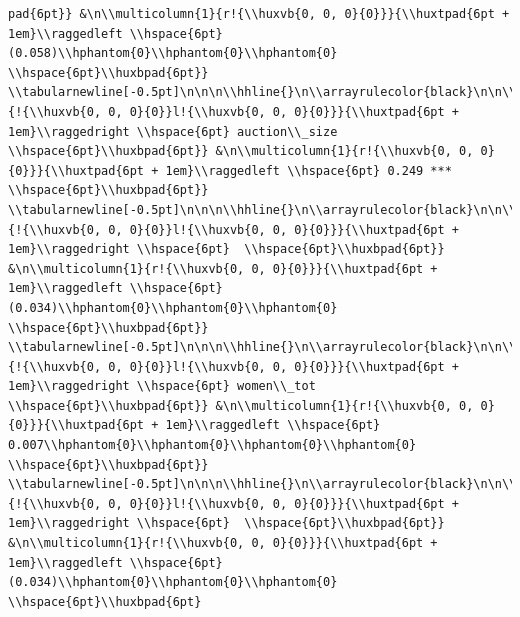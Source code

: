 \documentclass[11pt,preprint, authoryear]{elsarticle}
\numberwithin{equation}{section}
\numberwithin{figure}{section}
\numberwithin{table}{section}
\begin{document}
\begin{verbatim}
pad{6pt}} &\n\\multicolumn{1}{r!{\\huxvb{0, 0, 0}{0}}}{\\huxtpad{6pt + 1em}\\raggedleft \\hspace{6pt} (0.058)\\hphantom{0}\\hphantom{0}\\hphantom{0} \\hspace{6pt}\\huxbpad{6pt}} \\tabularnewline[-0.5pt]\n\n\n\\hhline{}\n\\arrayrulecolor{black}\n\n\\multicolumn{1}{!{\\huxvb{0, 0, 0}{0}}l!{\\huxvb{0, 0, 0}{0}}}{\\huxtpad{6pt + 1em}\\raggedright \\hspace{6pt} auction\\_size \\hspace{6pt}\\huxbpad{6pt}} &\n\\multicolumn{1}{r!{\\huxvb{0, 0, 0}{0}}}{\\huxtpad{6pt + 1em}\\raggedleft \\hspace{6pt} 0.249 *** \\hspace{6pt}\\huxbpad{6pt}} \\tabularnewline[-0.5pt]\n\n\n\\hhline{}\n\\arrayrulecolor{black}\n\n\\multicolumn{1}{!{\\huxvb{0, 0, 0}{0}}l!{\\huxvb{0, 0, 0}{0}}}{\\huxtpad{6pt + 1em}\\raggedright \\hspace{6pt}  \\hspace{6pt}\\huxbpad{6pt}} &\n\\multicolumn{1}{r!{\\huxvb{0, 0, 0}{0}}}{\\huxtpad{6pt + 1em}\\raggedleft \\hspace{6pt} (0.034)\\hphantom{0}\\hphantom{0}\\hphantom{0} \\hspace{6pt}\\huxbpad{6pt}} \\tabularnewline[-0.5pt]\n\n\n\\hhline{}\n\\arrayrulecolor{black}\n\n\\multicolumn{1}{!{\\huxvb{0, 0, 0}{0}}l!{\\huxvb{0, 0, 0}{0}}}{\\huxtpad{6pt + 1em}\\raggedright \\hspace{6pt} women\\_tot \\hspace{6pt}\\huxbpad{6pt}} &\n\\multicolumn{1}{r!{\\huxvb{0, 0, 0}{0}}}{\\huxtpad{6pt + 1em}\\raggedleft \\hspace{6pt} 0.007\\hphantom{0}\\hphantom{0}\\hphantom{0}\\hphantom{0} \\hspace{6pt}\\huxbpad{6pt}} \\tabularnewline[-0.5pt]\n\n\n\\hhline{}\n\\arrayrulecolor{black}\n\n\\multicolumn{1}{!{\\huxvb{0, 0, 0}{0}}l!{\\huxvb{0, 0, 0}{0}}}{\\huxtpad{6pt + 1em}\\raggedright \\hspace{6pt}  \\hspace{6pt}\\huxbpad{6pt}} &\n\\multicolumn{1}{r!{\\huxvb{0, 0, 0}{0}}}{\\huxtpad{6pt + 1em}\\raggedleft \\hspace{6pt} (0.034)\\hphantom{0}\\hphantom{0}\\hphantom{0} \\hspace{6pt}\\huxbpad{6pt}
\end{verbatim}
\end{document}
